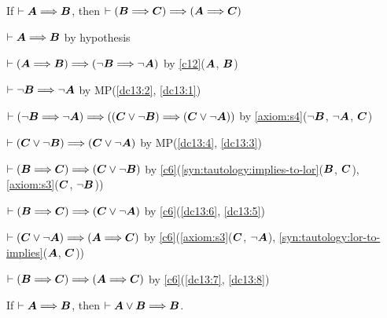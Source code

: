 \begin{dc}\label{c13}%
If $\vdash\boldsymbol{A}\Longrightarrow\boldsymbol{B}$,
then $\vdash(\boldsymbol{B}\Longrightarrow\boldsymbol{C})\Longrightarrow(\boldsymbol{A}\Longrightarrow\boldsymbol{C})$
\end{dc}

\begin{pf}
\item\label{dc13:1}\Pf $\vdash\boldsymbol{A}\Longrightarrow\boldsymbol{B}$ by hypothesis
\item\label{dc13:2} $\vdash(\boldsymbol{A}\Longrightarrow\boldsymbol{B})\Longrightarrow(\neg\boldsymbol{B}\Longrightarrow\neg\boldsymbol{A})$
  by \ref{c12}($\boldsymbol{A}$, $\boldsymbol{B}$)
\item\label{dc13:3} $\vdash\neg\boldsymbol{B}\Longrightarrow\neg\boldsymbol{A}$
  by MP(\ref{dc13:2}, \ref{dc13:1})
\item\label{dc13:4} $\vdash(\neg\boldsymbol{B}\Longrightarrow\neg\boldsymbol{A})\Longrightarrow((\boldsymbol{C}\lor\neg\boldsymbol{B})\Longrightarrow(\boldsymbol{C}\lor\neg\boldsymbol{A}))$
  by \ref{axiom:s4}($\neg\boldsymbol{B}$, $\neg\boldsymbol{A}$, $\boldsymbol{C}$)
\item\label{dc13:5} $\vdash(\boldsymbol{C}\lor\neg\boldsymbol{B})\Longrightarrow(\boldsymbol{C}\lor\neg\boldsymbol{A})$
  by MP(\ref{dc13:4}, \ref{dc13:3})
\item\label{dc13:6} $\vdash(\boldsymbol{B}\Longrightarrow\boldsymbol{C})\Longrightarrow(\boldsymbol{C}\lor\neg\boldsymbol{B})$
  by \ref{c6}(\ref{syn:tautology:implies-to-lor}($\boldsymbol{B}$, $\boldsymbol{C}$),
  \ref{axiom:s3}($\boldsymbol{C}$, $\neg\boldsymbol{B}$))
\item\label{dc13:7} $\vdash(\boldsymbol{B}\Longrightarrow\boldsymbol{C})\Longrightarrow(\boldsymbol{C}\lor\neg\boldsymbol{A})$
  by \ref{c6}(\ref{dc13:6}, \ref{dc13:5})
\item\label{dc13:8} $\vdash(\boldsymbol{C}\lor\neg\boldsymbol{A})\Longrightarrow(\boldsymbol{A}\Longrightarrow\boldsymbol{C})$
  by \ref{c6}(\ref{axiom:s3}($\boldsymbol{C}$, $\neg\boldsymbol{A}$),
  \ref{syn:tautology:lor-to-implies}($\boldsymbol{A}$, $\boldsymbol{C}$))
\item $\vdash(\boldsymbol{B}\Longrightarrow\boldsymbol{C})\Longrightarrow(\boldsymbol{A}\Longrightarrow\boldsymbol{C})$
  by \ref{c6}(\ref{dc13:7}, \ref{dc13:8})
\end{pf}

\begin{theorem}\label{thm:3-2-1}%
If $\vdash\boldsymbol{A}\Longrightarrow\boldsymbol{B}$, then $\vdash\boldsymbol{A}\lor\boldsymbol{B}\Longrightarrow\boldsymbol{B}$.
\end{theorem}

